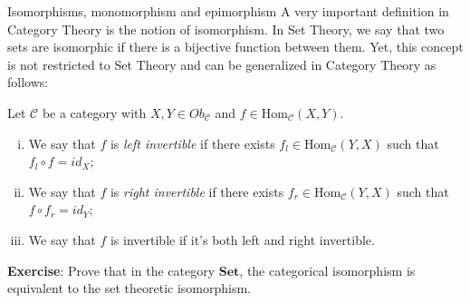 \documentclass[aspectratio=169,xcolor=dvipsnames,10pt]{beamer}
\theoremstyle{definition}
\begin{document}
\begin{frame}[fragile]{Isomorphisms, monomorphism and epimorphism}
    A very important definition in Category Theory is the notion of isomorphism. In Set Theory,
    we say that two sets are isomorphic if there is a bijective function between them. Yet, this
    concept is not restricted to Set Theory and can be generalized in Category Theory as follows:
	\begin{definition}
        Let $\mathcal C$ be a category with $X,Y \in Ob_\mathcal C$ and $f \in \text{Hom}_\mathcal C (X,Y)$.
        \begin{enumerate}[(i)]
            \item We say that $f$ is \textit{left invertible} if there exists $f_l \in \text{Hom}_\mathcal C (Y,X)$ such
                  that $f_l \circ f = id_X$;
              \item We say that $f$ is \textit{right invertible} if there exists $f_r \in \text{Hom}_\mathcal C (Y,X)$ such
                  that $f \circ f_r = id_Y$;
            \item We say that $f$ is invertible if it's both left and right invertible.
        \end{enumerate}
	\end{definition}
    \textbf{Exercise}: Prove that in the category $\mathbf{Set}$, the categorical isomorphism is equivalent to
    the set theoretic isomorphism.
\end{frame}

\end{document}
